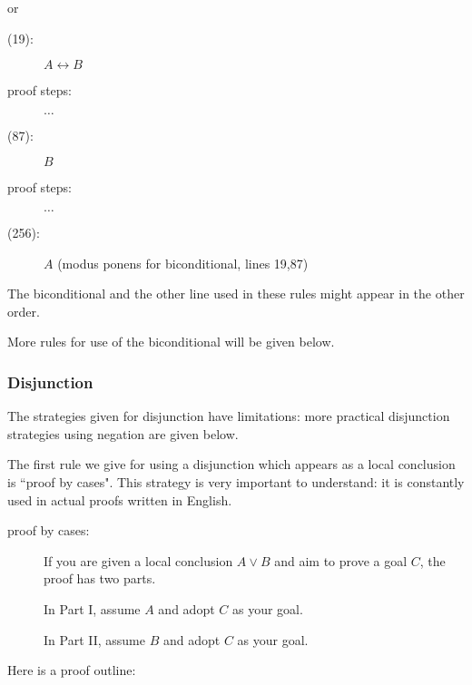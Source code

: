 \documentclass[12pt]{article}
\begin{document}
or

\begin{description}
\item[(19):]  $A \leftrightarrow B$

\item[proof steps:]  $\ldots$

\item[(87):]  $B$

\item[proof steps:]  $\ldots$

\item [(256):]  $A$ (modus ponens for biconditional, lines 19,87)


\end{description}

The biconditional and the other line used in these rules might appear in the other order.

More rules for use of the biconditional will be given below.

\newpage


\newpage
\subsubsection{Disjunction}

The strategies given for disjunction have limitations:  more practical disjunction strategies using negation are given below.

The first  rule we give for using a disjunction which appears as a local conclusion is ``proof by cases".  This strategy is very important to understand:  it is constantly used in actual proofs written in English.

\begin{description}

\item[proof by cases:]  If you are given a local conclusion $A \vee B$
and aim to prove a goal $C$, the proof has two parts.

In Part I, assume $A$ and adopt $C$ as your goal.

In Part II, assume $B$ and adopt $C$ as your goal.



\end{description}

Here is a proof outline:
\end{document}
